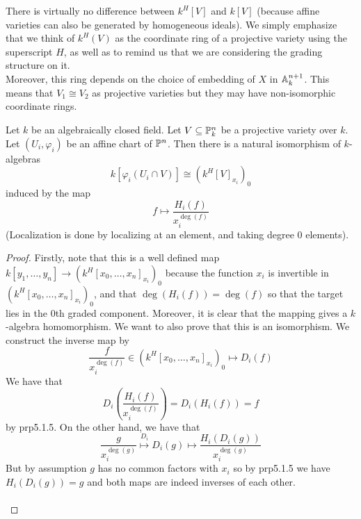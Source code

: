 \documentclass[a4paper]{article}
\begin{document}
There is virtually no difference between $k^H[V]$ and $k[V]$ (because affine varieties can also be generated by homogeneous ideals). We simply emphasize that we think of $k^H(V)$ as the coordinate ring of a projective variety using the superscript $H$, as well as to remind us that we are considering the grading structure on it. \\

Moreover, this ring depends on the choice of embedding of $X$ in $\mathbb{A}_k^{n+1}$. This means that $V_1\cong V_2$ as projective varieties but they may have non-isomorphic coordinate rings. 

\begin{prp}{}{} Let $k$ be an algebraically closed field. Let $V\subseteq\mathbb{P}_k^n$ be a projective variety over $k$. Let $(U_i,\varphi_i)$ be an affine chart of $\mathbb{P}^n$. Then there is a natural isomorphism of $k$-algebras $$k[\varphi_i(U_i\cap V)]\cong(k^H[V]_{x_i})_0$$ induced by the map $$f\mapsto\frac{H_i(f)}{x_i^{\deg(f)}}$$ (Localization is done by localizing at an element, and taking degree $0$ elements). \tcbline
\begin{proof}
Firstly, note that this is a well defined map $k[y_1,\dots,y_n]\to(k^H[x_0,\dots,x_n]_{x_i})_0$ because the function $x_i$ is invertible in $(k^H[x_0,\dots,x_n]_{x_i})_0$, and that $\deg(H_i(f))=\deg(f)$ so that the target lies in the $0$th graded component. Moreover, it is clear that the mapping gives a $k$-algebra homomorphism. We want to also prove that this is an isomorphism. We construct the inverse map by $$\frac{f}{x_i^{\deg(f)}}\in(k^H[x_0,\dots,x_n]_{x_i})_0\mapsto D_i(f)$$ We have that $$D_i\left(\frac{H_i(f)}{x_i^{\deg(f)}}\right)=D_i(H_i(f))=f$$ by prp5.1.5. On the other hand, we have that $$\frac{g}{x_i^{\deg(g)}}\overset{D_i}{\mapsto}D_i(g)\mapsto\frac{H_i(D_i(g))}{x_i^{\deg(g)}}$$ But by assumption $g$ has no common factors with $x_i$ so by prp5.1.5 we have $H_i(D_i(g))=g$ and both maps are indeed inverses of each other. \\~\\


\end{proof}
\end{prp}
\end{document}
